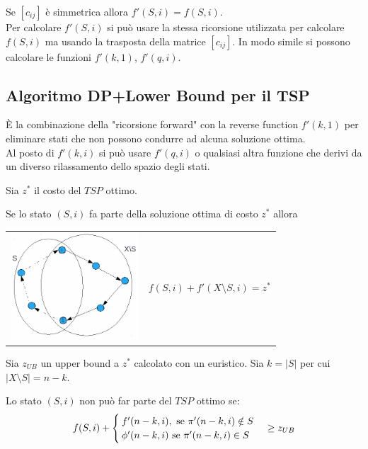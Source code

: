 Se $[c_{ij}]$ è simmetrica allora $f'(S,i)=f(S,i)$.\\
Per calcolare $f'(S,i)$ si può usare la stessa ricorsione utilizzata per calcolare $f(S,i)$ ma usando la trasposta della matrice $[c_{ij}]$. In modo simile si possono calcolare le funzioni $f'(k,1)$, $f'(q,i)$.

\subsection{Algoritmo DP+Lower Bound per il TSP}
È la combinazione della "ricorsione forward" con la reverse function $f'(k,1)$ per eliminare stati che non possono condurre ad alcuna soluzione ottima.\\
Al posto di $f'(k,i)$ si può usare $f'(q,i)$ o qualsiasi altra funzione che derivi da un diverso rilassamento dello spazio degli stati.

Sia $z^{*}$ il costo del $TSP$ ottimo.

Se lo stato $(S,i)$ fa parte della soluzione ottima di costo $z^{*}$ allora

\begin{table}[!h]
	\begin{tabular}{m{6cm} m{7.5cm}}
		\includegraphics[height=4cm]{images/graph50.png} &
		\begin{equation*}
			f(S,i)+f'(X\setminus S,i)=z^{*}
		\end{equation*}
	\end{tabular}
\end{table}
Sia $z_{UB}$ un upper bound a $z^{*}$ calcolato con un euristico. Sia $k=|S|$ per cui $|X\setminus S|=n-k$.

Lo stato $(S,i)$ non può far parte del $TSP$ ottimo se:
\begin{equation*}
	f(S,i)+
	\begin{cases}
		f'(n-k,i),\ \textnormal{se }\pi'(n-k,i)\notin S \\
		\phi'(n-k,i)\ \textnormal{se }\pi'(n-k,i)\in S
	\end{cases}
	\ge z_{UB}
\end{equation*}


